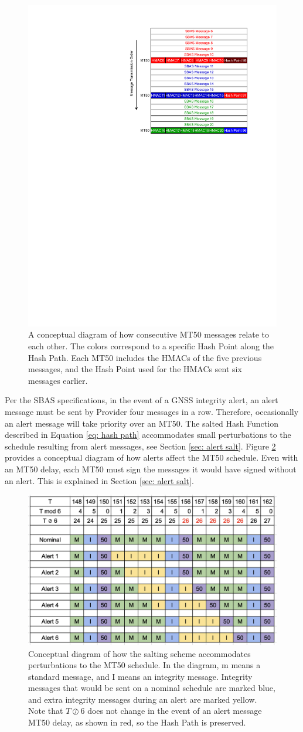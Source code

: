 \documentclass[letterpaper,times]{IONconf/IONconf}
\begin{document}
\begin{figure}
\centering
\includegraphics[width=0.5\linewidth]{fig/MT50Schedule.pdf}
\caption{A conceptual diagram of how consecutive MT50 messages relate to each other. The colors correspond to a specific Hash Point along the Hash Path. Each MT50 includes the HMACs of the five previous messages, and the Hash Point used for the HMACs sent six messages earlier.}
\label{fig: MT50 Schedule}
\end{figure}

Per the SBAS specifications, in the event of a GNSS integrity alert, an alert message must be sent by Provider four messages in a row.
Therefore,  occasionally an alert message will take priority over an MT50.
The salted Hash Function described in Equation \eqref{eq: hash path} accommodates small perturbations to the schedule resulting from alert messages, see Section \ref{sec: alert salt}.
Figure \ref{fig: alert schedule} provides a conceptual diagram of how alerts affect the MT50 schedule.
Even with an MT50 delay, each MT50 must sign the messages it would have signed without an alert.
This is explained in Section \ref{sec: alert salt}.

\begin{figure}
\centering
\includegraphics[width=0.5\linewidth]{fig/alertschedule.png}
\caption{Conceptual diagram of how the salting scheme accommodates perturbations to the MT50 schedule. In the diagram, m means a standard message, and I means an integrity message. Integrity messages that would be sent on a nominal schedule are marked blue, and extra integrity messages during an alert are marked yellow. Note that $T \oslash 6$ does not change in the event of an alert message MT50 delay, as shown in red, so the Hash Path is preserved.}
\label{fig: alert schedule}
\end{figure}
\end{document}
